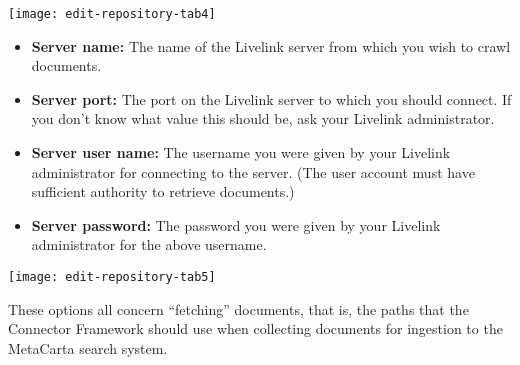 \texttt{[image: edit-repository-tab4]}

\begin{itemize}

\item \textbf{Server name:} The name of the Livelink server from which you wish
to crawl documents.

\item \textbf{Server port:} The port on the Livelink server to which you
should connect. If you don't know what value this should be, ask your
Livelink administrator.

\item \textbf{Server user name:} The username you were given by your
Livelink administrator for connecting to the server. (The user account
must have sufficient authority to retrieve documents.)

\item \textbf{Server password:} The password you were given by your
Livelink administrator for the above username.

\end{itemize}

\texttt{[image: edit-repository-tab5]}

These options all concern ``fetching'' documents, that is, the paths
that the Connector Framework should use when collecting documents for
ingestion to the MetaCarta search system. 

